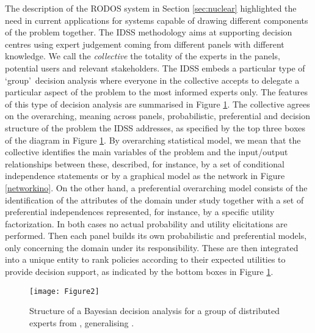 The description of the RODOS system in Section \ref{sec:nuclear} highlighted the need in current applications for systems capable of drawing different components of the problem together. The IDSS methodology aims at supporting decision centres using expert judgement coming from different panels with different knowledge. We call the \textit{collective} the totality of the experts in the panels, potential users and relevant stakeholders. The IDSS embeds a particular type of \lq{group}\rq ~decision analysis where everyone in the collective accepts to delegate a particular aspect of the problem to the most informed experts  only. The features of this type of decision analysis are summarised in Figure \ref{diagramma}. The collective agrees on the overarching, meaning across panels, probabilistic, preferential and decision structure of the problem the IDSS addresses, as specified by the top three boxes of the diagram in Figure \ref{diagramma}. By overarching statistical model, we mean that the collective identifies the main variables of the problem and the input/output relationships between these, described, for instance, by a set of conditional independence statements or by a graphical model as the network in Figure \ref{networkino}. On the other hand, a preferential overarching model consists of the identification of the attributes of the domain under study together with a set of preferential independences represented, for instance, by a specific utility factorization. In both cases no actual probability and utility elicitations are performed. Then each panel builds its own probabilistic and preferential models, only concerning the domain under its responsibility. These are then integrated into a unique entity to rank policies according to their expected utilities to provide decision support, as indicated by the bottom boxes in Figure \ref{diagramma}.
\begin{figure}
\begin{center}
\texttt{[image: Figure2]}
\end{center}
\caption{Structure of a Bayesian decision analysis for a group of distributed experts from \citet{Leonelli2015}, generalising \citet{French97}. \label{diagramma}}
\end{figure}

